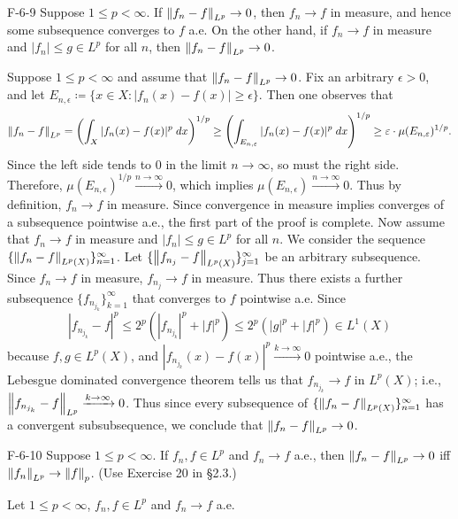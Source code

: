 \documentclass{article}
\begin{document}
	\begin{prb}{F-6-9}
		Suppose $1 \leq p < \infty$. If $\left\Vert f_{n}-f \right\Vert_{L^p} \to 0$, then $f_{n} \to f$ in measure, and hence some subsequence converges to $f$ a.e. On the other hand, if $f_{n} \to f$ in measure and $|f_{n}| \leq g \in L^{p}$ for all $n$, then $\left\Vert f_{n}-f \right\Vert_{L^{p}} \to 0$.
	\end{prb}
	Suppose $1 \leq p < \infty$ and assume that $\left\Vert f_{n} - f \right\Vert_{L^{p}} \to 0$. Fix an arbitrary $\epsilon > 0$, and let $E_{n,\epsilon} \coloneqq \{x \in X: |f_{n}(x) - f(x)| \geq \epsilon\}$. Then one observes that 
	\begin{equation*}
		\left\Vert f_{n} - f \right\Vert_{L^{p}} = \left(\int_{X}|f_{n}(x) - f(x)|^{p}\;dx\right)^{1/p} \geq \left(\int_{E_{n,\varepsilon}}|f_{n}(x) - f(x)|^{p}\;dx\right)^{1/p} \geq \varepsilon \cdot \mu(E_{n,\varepsilon})^{1/p}. 
	\end{equation*}
	Since the left side tends to 0 in the limit $n \to \infty$, so must the right side. Therefore, $\mu(E_{n, \epsilon})^{1/p} \xrightarrow{n \to \infty} 0$, which implies $\mu(E_{n, \epsilon}) \xrightarrow{n \to \infty} 0$. Thus by definition, $f_{n} \to f$ in measure. Since convergence in measure implies converges of a subsequence pointwise a.e., the first part of the proof is complete. Now assume that $f_{n} \to f$ in measure and $|f_{n}| \leq g \in L^{p}$ for all $n$. We consider the sequence $\{\left\Vert f_{n} - f \right\Vert_{L^{p}(X)}\}_{n = 1}^{\infty}$. Let $\{\left\Vert f_{n_{j}} - f \right\Vert_{L^{p}(X)}\}_{j = 1}^{\infty}$ be an arbitrary subsequence. Since $f_{n} \to f$ in measure, $f_{n_{j}} \to f$ in measure. Thus there exists a further subsequence $\{f_{n_{j_{k}}}\}_{k = 1}^{\infty}$ that converges to $f$ pointwise a.e. Since 
	\begin{equation*}
		|f_{n_{j_{k}}} - f|^{p} \leq 2^{p}(|f_{n_{j_{k}}}|^{p} + |f|^{p}) \leq 2^{p}(|g|^{p} + |f|^{p}) \in L^{1}(X)
	\end{equation*}
	because $f, g \in L^{p}(X)$, and $|f_{n_{j_{k}}}(x) - f(x)|^{p} \xrightarrow{k \to \infty} 0$ pointwise a.e., the Lebesgue dominated convergence theorem tells us that $f_{n_{j_{k}}} \to f$ in $L^{p}(X)$; i.e., $\left\Vert f_{n_{j_{k}}} - f \right\Vert_{L^{p}} \xrightarrow{k \to \infty} 0$. Thus since every subsequence of $\{\left\Vert f_{n} - f \right\Vert_{L^{p}(X)}\}_{n=1}^{\infty}$ has a convergent subsubsequence, we conclude that $\left\Vert f_{n} - f \right\Vert_{L^{p}} \to 0$. 
	
	\begin{prb}{F-6-10}
		Suppose $1 \leq p < \infty$. If $f_{n}, f \in L^{p}$ and $f_{n} \to f$ a.e., then $\left\Vert f_{n} - f \right\Vert_{L^{p}} \to 0$ iff $\left\Vert f_{n} \right\Vert_{L^{p}} \to \left\Vert f \right\Vert_{p}$. (Use Exercise 20 in \S 2.3.) 
	\end{prb}
	Let $1 \leq p < \infty$, $f_{n}, f \in L^{p}$ and $f_{n} \to f$ a.e. 
	
\end{document}
